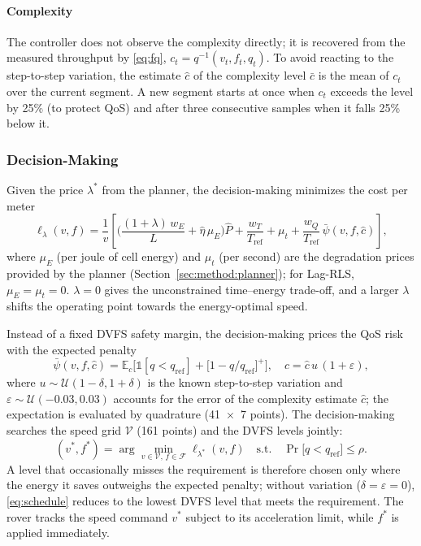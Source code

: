 \paragraph{Complexity}
The controller does not observe the complexity directly; it is recovered from the measured
throughput by \eqref{eq:fq},
$c_t = q^{-1}(v_t, f_t, q_t)$. To avoid reacting to the step-to-step variation, the estimate $\hat c$ of the
complexity level $\bar c$ is the mean of $c_t$ over the current segment. A new segment starts at once when $c_t$ exceeds the level by
25\% (to protect \ac{QoS}) and after three consecutive samples when it falls 25\% below it.

\subsubsection{Decision-Making}
\label{sec:method:schedule}

Given the price $\lambda^\ast$ from the planner, the decision-making minimizes the cost per meter
\begin{equation}
  \ell_\lambda(v, f) = \frac{1}{v}\left[
    \Big(\frac{(1+\lambda)\,w_E}{L} + \hat\eta\,\mu_E\Big) \hat P
    + \frac{w_T}{T_{\mathrm{ref}}} + \mu_t
    + \frac{w_Q}{T_{\mathrm{ref}}}\, \bar\psi(v, f, \hat c) \right],
  \label{eq:lagrangian}
\end{equation}
where $\mu_E$ (per joule of cell energy) and $\mu_t$ (per second) are the degradation prices
provided by the planner (Section~\ref{sec:method:planner}); for Lag-RLS, $\mu_E = \mu_t = 0$.
$\lambda = 0$ gives the unconstrained time--energy trade-off, and a larger $\lambda$ shifts the
operating point towards the energy-optimal speed.

Instead of a fixed \ac{DVFS} safety margin, the decision-making prices the \ac{QoS} risk
with the expected penalty
\begin{equation}
  \bar\psi(v, f, \hat c) = \mathbb{E}_{c}\Big[\mathbb{1}[q < q_{\mathrm{ref}}]
    + \big[1 - q/q_{\mathrm{ref}}\big]^+\Big],
  \quad c = \hat c\, u\, (1+\varepsilon),
  \label{eq:qos_cost}
\end{equation}
where $u \sim \mathcal{U}(1-\delta, 1+\delta)$ is the known step-to-step variation and
$\varepsilon \sim \mathcal{U}(-0.03, 0.03)$ accounts for the error of the complexity estimate $\hat c$;
the expectation is evaluated by quadrature (41~$\times$~7 points).
The decision-making searches the speed grid $\mathcal{V}$ (161 points) and the \ac{DVFS} levels jointly:
\begin{equation}
  (v^\ast, f^\ast) = \arg\min_{v \in \mathcal{V},\, f \in \mathcal{F}}
           \ell_{\lambda^\ast}(v, f)
  \quad \text{s.t.} \quad \Pr\big[q < q_{\mathrm{ref}}\big] \leq \rho .
  \label{eq:schedule}
\end{equation}
A level that occasionally misses the requirement is therefore chosen only where the energy it
saves outweighs the expected penalty; without variation ($\delta = \varepsilon = 0$),
\eqref{eq:schedule} reduces to the lowest \ac{DVFS} level that meets the requirement.
The rover tracks the speed command $v^\ast$ subject to its acceleration limit, while $f^\ast$ is
applied immediately.

